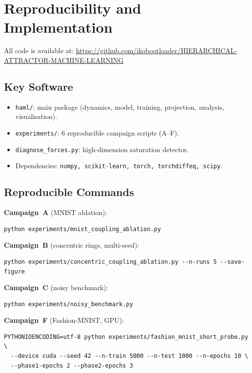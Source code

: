\documentclass[11pt,a4paper]{article}
\begin{document}
\section{Reproducibility and Implementation}

All code is available at:
\url{https://github.com/ikobootloader/HIERARCHICAL-ATTRACTOR-MACHINE-LEARNING}

\subsection{Key Software}

\begin{itemize}
  \item \texttt{haml/}: main package (dynamics, model, training, projection, analysis,
        visualisation).
  \item \texttt{experiments/}: 6 reproducible campaign scripts (A--F).
  \item \texttt{diagnose\_forces.py}: high-dimension saturation detector.
  \item Dependencies: \texttt{numpy, scikit-learn, torch, torchdiffeq, scipy}.
\end{itemize}

\subsection{Reproducible Commands}

\textbf{Campaign~A} (MNIST ablation):
\begin{verbatim}
python experiments/mnist_coupling_ablation.py
\end{verbatim}

\textbf{Campaign~B} (concentric rings, multi-seed):
\begin{verbatim}
python experiments/concentric_coupling_ablation.py --n-runs 5 --save-figure
\end{verbatim}

\textbf{Campaign~C} (noisy benchmark):
\begin{verbatim}
python experiments/noisy_benchmark.py
\end{verbatim}

\textbf{Campaign~F} (Fashion-MNIST, GPU):
\begin{verbatim}
PYTHONIOENCODING=utf-8 python experiments/fashion_mnist_short_probe.py \
  --device cuda --seed 42 --n-train 5000 --n-test 1000 --n-epochs 10 \
  --phase1-epochs 2 --phase2-epochs 3
\end{verbatim}
\end{document}
